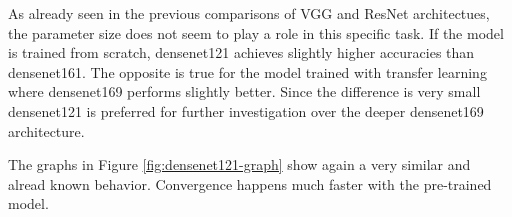 \begin{table}[h] \centering
{}
\caption{Hyper parameters for densenet121 optimized with SigOpt. First row shows hyperparameters training the architecture from scratch. Second row used pre-trained weights from ImageNet}
\label{tbl:Densenet121_overview}
\end{table}

As already seen in the previous comparisons of VGG and ResNet architectues, the parameter size does not seem to play a role in this specific task. If the model is trained from scratch, densenet121 achieves slightly higher accuracies than densenet161. The opposite is true for the model trained with transfer learning where densenet169 performs slightly better. Since the difference is very small densenet121 is preferred for further investigation over the deeper densenet169 architecture.

The graphs in Figure \ref{fig:densenet121-graph} show again a very similar and alread known behavior. Convergence happens much faster with the pre-trained model.

